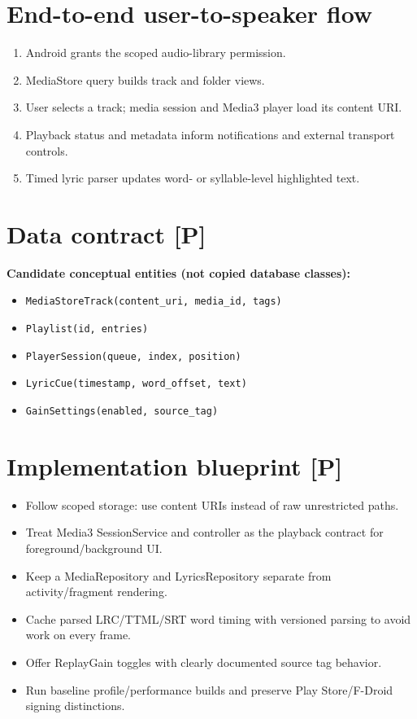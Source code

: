 \documentclass[10pt,a4paper,oneside]{report}
\begin{document}
\section{End-to-end user-to-speaker flow}
\begin{enumerate}[leftmargin=*,itemsep=2pt,topsep=2pt]
\item Android grants the scoped audio-library permission.
\item MediaStore query builds track and folder views.
\item User selects a track; media session and Media3 player load its content URI.
\item Playback status and metadata inform notifications and external transport controls.
\item Timed lyric parser updates word- or syllable-level highlighted text.
\end{enumerate}
\section{Data contract [P]}
\begin{evidencebox}\small\textbf{Candidate conceptual entities (not copied database classes):}\par
\begin{itemize}[leftmargin=*,itemsep=1pt,topsep=2pt]
\item \texttt{MediaStoreTrack(content\_uri, media\_id, tags)}
\item \texttt{Playlist(id, entries)}
\item \texttt{PlayerSession(queue, index, position)}
\item \texttt{LyricCue(timestamp, word\_offset, text)}
\item \texttt{GainSettings(enabled, source\_tag)}
\end{itemize}\end{evidencebox}
\section{Implementation blueprint [P]}
\begin{itemize}[leftmargin=*,itemsep=2pt,topsep=3pt]
\item Follow scoped storage: use content URIs instead of raw unrestricted paths.
\item Treat Media3 SessionService and controller as the playback contract for foreground/background UI.
\item Keep a MediaRepository and LyricsRepository separate from activity/fragment rendering.
\item Cache parsed LRC/TTML/SRT word timing with versioned parsing to avoid work on every frame.
\item Offer ReplayGain toggles with clearly documented source tag behavior.
\item Run baseline profile/performance builds and preserve Play Store/F-Droid signing distinctions.
\end{itemize}
\end{document}
